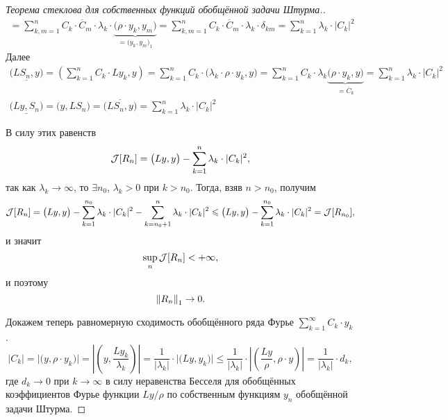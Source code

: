 \documentclass[12pt,a4paper,openany,fleqn]{book}
\newcommand{\J}{\ensuremath{\mathcal{J}}}
\newcommand{\norm}[1]{\ensuremath{\left\|#1\right\|}}
\theoremstyle{definition}
\begin{document}
\begin{proof}[Теорема стеклова для собственных функций обобщённой задачи Штурма.]
\begin{multline*}
			=\sum\limits_{k,m=1}^n C_k\cdot\overline{C}_m\cdot\lambda_k\cdot\underbrace{\big(\rho\cdot y_k,y_m\big)}_{\textstyle=\big(y_k,y_m\big)_1}=\sum\limits_{k,m=1}^n C_k\cdot\overline{C}_m\cdot\lambda_k\cdot\delta_{km}=\sum\limits_{k=1}^n\lambda_k\cdot|C_k|^2
		\end{multline*}
		Далее
		\begin{gather*}
			\underline{\big(LS_n,y\big)}=\left(\sum\limits_{k=1}^n C_k\cdot Ly_k,y\right)=\sum\limits_{k=1}^nC_k\cdot\big(\lambda_k\cdot\rho\cdot y_k,y\big)=\sum\limits_{k=1}^n C_k\cdot\lambda_k\underbrace{\big(\rho\cdot y_k,y\big)}_{\textstyle=\overline{C}_k}=\sum\limits_{k=1}^n\lambda_k\cdot|C_k|^2\\
			\underline{\big(Ly,S_n\big)}=\big(y,LS_n\big)=\overline{\big(LS_n,y\big)}=\sum\limits_{k=1}^n\lambda_k\cdot|C_k|^2
		\end{gather*}
		
		В силу этих равенств
		\begin{equation*}
			\hfill\J[R_n]=\big(Ly,y\big)-\sum\limits_{k=1}^n\lambda_k\cdot|C_k|^2,\hfill
		\end{equation*}
		так как $\lambda_k\to\infty$, то $\exists n_0$, $\lambda_k>0$ при $k>n_0$. Тогда, взяв $n>n_0$, получим 
		\begin{equation*}
			\hfill\J[R_n]=\big(Ly,y\big)-\sum\limits_{k=1}^{n_0}\lambda_k\cdot|C_k|^2-\sum\limits_{k=n_0+1}^n\lambda_k\cdot|C_k|^2\leqslant\big(Ly,y\big)-\sum\limits_{k=1}^{n_0}\lambda_k\cdot|C_k|^2=\J[R_{n_0}],\hfill
		\end{equation*}
		и значит 
		\begin{equation*}
			\hfill\sup\limits_{n}\J[R_n]<+\infty,\hfill
		\end{equation*}
		и поэтому
		\begin{equation*}
			\hfill\norm{R_n}_1\to0.\hfill
		\end{equation*}
	
		Докажем теперь равномерную сходимость обобщённого ряда Фурье $\displaystyle\sum\limits_{k=1}^{\infty}C_k\cdot y_k$.
		\begin{equation*}
			|C_k|=\big|\big(y,\rho\cdot y_k\big)\big|=\left|\left(y,\frac{Ly_k}{\lambda_k}\right)\right|=\frac1{|\lambda_k|}\cdot\big|\big(Ly,y_k\big)\big|\leqslant\frac1{|\lambda_k|}\cdot\left|\left(\frac{Ly}{\rho},\rho\cdot y\right)\right|=\frac1{|\lambda_k|}\cdot d_k,
		\end{equation*} 
		где $d_k\to0$ при $k\to\infty$ в силу неравенства Бесселя для обобщённых коэффициентов Фурье функции $Ly/\rho$ по собственным функциям $y_n$ обобщённой задачи Штурма.
		

\end{proof}
\end{document}
